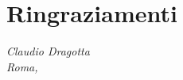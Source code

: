 \documentclass[oneside, 12pt]{report}
\begin{document}
\appendix






\begingroup
\setlength{\emergencystretch}{2em}
\printbibliography[heading=bibintoc, title={Bibliografia}]
\endgroup

\chapter*{Ringraziamenti}
\begin{onehalfspace}
\ifdefined\copiarelatore\else
  
\fi


\vspace{1cm}
\begin{flushright}
\textit{Claudio Dragotta} \\
\textit{Roma, \the\year}
\end{flushright}
\end{onehalfspace}
\end{document}
